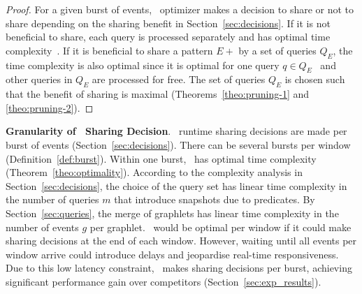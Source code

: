 \begin{proof}
%
For a given burst of events, \app\ optimizer makes a decision to share or not to share depending on the sharing benefit in Section~\ref{sec:decisions}. 
If it is not beneficial to share, each query is processed separately and has optimal time complexity~\cite{PLRM18}.
If it is beneficial to share a pattern $E+$ by a set of queries $Q_E$, the time complexity is also optimal since it is optimal for one query $q \in Q_E$~\cite{PLRM18} and other queries in $Q_E$ are processed for free.
The set of queries $Q_E$ is chosen such that the benefit of sharing is maximal (Theorems~\ref{theo:pruning-1} and \ref{theo:pruning-2}).
%
\end{proof}


\textbf{Granularity of \app\ Sharing Decision}.
%
\app\ runtime sharing decisions are made per burst of events (Section~\ref{sec:decisions}). There can be several bursts per window (Definition~\ref{def:burst}). Within one burst, \app\ has optimal time complexity (Theorem~\ref{theo:optimality}).
According to the complexity analysis in Section~\ref{sec:decisions}, the choice of the query set has linear time complexity in the number of queries $m$ that introduce snapshots due to predicates. 
By Section~\ref{sec:queries}, the merge of graphlets has linear time complexity in the number of events $g$ per graphlet. 
\app\ would be optimal per window if it could make sharing decisions at the end of each window. However, waiting until all events per window arrive could introduce delays and jeopardise real-time responsiveness. Due to this low latency constraint, \app\ makes sharing decisions per burst, achieving significant performance gain over competitors (Section~\ref{sec:exp_results}).




